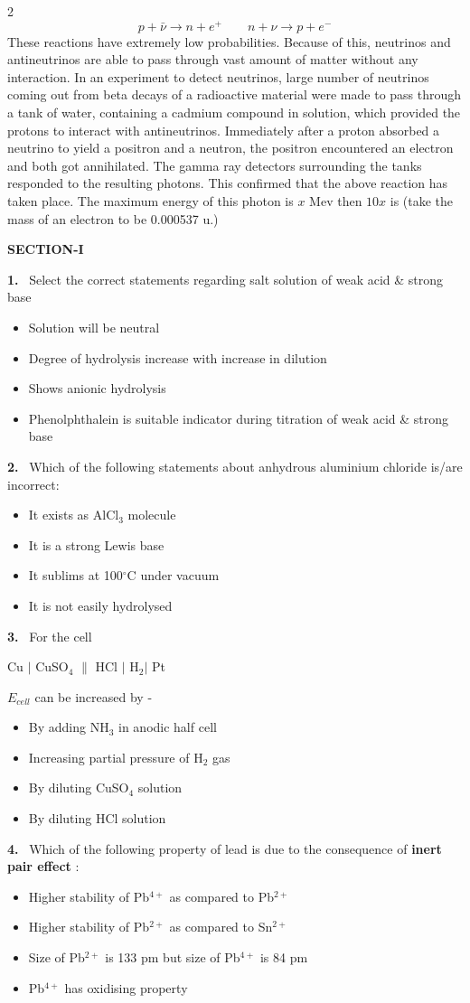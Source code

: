 \documentclass[10pt]{extarticle}
\newcommand{\partsec}[2]{\par\medskip\noindent{\large\bfseries PART-#1: #2}\par\smallskip}
\newcommand{\sect}[1]{\par\smallskip\noindent\textbf{#1}\par}
\newcommand{\qn}[1]{\par\smallskip\noindent\textbf{#1.}~}
\newenvironment{qoptions}{\begin{itemize}[leftmargin=1.8em,itemsep=1pt,topsep=2pt,label={}]}{\end{itemize}}
\newcommand{\opt}[2]{\item[(#1)] #2}
\begin{document}
\begin{multicols}{2}
\[p+\bar\nu\to n+e^+\qquad n+\nu\to p+e^-\]
These reactions have extremely low probabilities. Because of this, neutrinos and antineutrinos are able to pass through vast amount of matter without any interaction. In an experiment to detect neutrinos, large number of neutrinos coming out from beta decays of a radioactive material were made to pass through a tank of water, containing a cadmium compound in solution, which provided the protons to interact with antineutrinos. Immediately after a proton absorbed a neutrino to yield a positron and a neutron, the positron encountered an electron and both got annihilated. The gamma ray detectors surrounding the tanks responded to the resulting photons. This confirmed that the above reaction has taken place. The maximum energy of this photon is $x$ Mev then $10x$ is (take the mass of an electron to be 0.000537 u.)
\partsec{2}{CHEMISTRY}
\sect{SECTION-I}
\qn{1} Select the correct statements regarding salt solution of weak acid \& strong base
\begin{qoptions}
\opt{A}{Solution will be neutral}
\opt{B}{Degree of hydrolysis increase with increase in dilution}
\opt{C}{Shows anionic hydrolysis}
\opt{D}{Phenolphthalein is suitable indicator during titration of weak acid \& strong base}
\end{qoptions}
\qn{2} Which of the following statements about anhydrous aluminium chloride is/are incorrect:
\begin{qoptions}
\opt{A}{It exists as AlCl$_3$ molecule}
\opt{B}{It is a strong Lewis base}
\opt{C}{It sublims at 100$^\circ$C under vacuum}
\opt{D}{It is not easily hydrolysed}
\end{qoptions}
\qn{3} For the cell\par
Cu $|$ CuSO$_4$ $\|$ HCl $|$ H$_2|$ Pt\par
$E_{cell}$ can be increased by -
\begin{qoptions}
\opt{A}{By adding NH$_3$ in anodic half cell}
\opt{B}{Increasing partial pressure of H$_2$ gas}
\opt{C}{By diluting CuSO$_4$ solution}
\opt{D}{By diluting HCl solution}
\end{qoptions}
\qn{4} Which of the following property of lead is due to the consequence of \textbf{inert pair effect} :
\begin{qoptions}
\opt{A}{Higher stability of Pb$^{4+}$ as compared to Pb$^{2+}$}
\opt{B}{Higher stability of Pb$^{2+}$ as compared to Sn$^{2+}$}
\opt{C}{Size of Pb$^{2+}$ is 133 pm but size of Pb$^{4+}$ is 84 pm}
\opt{D}{Pb$^{4+}$ has oxidising property}
\end{qoptions}

\end{multicols}
\end{document}
